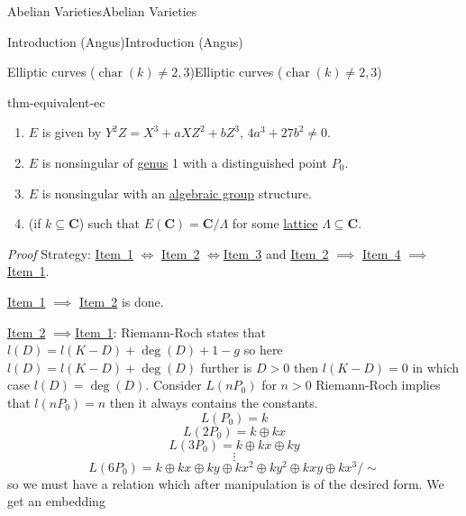 \documentclass[10pt,]{book}
\makeatletter
\renewcommand*{\proofname}{Proof}
\renewenvironment{proof}[1][\proofname]{\par
  \pushQED{\qed}%
  \normalfont \topsep6\p@\@plus6\p@\relax
  \trivlist
  \item\relax
    {\itshape
    #1\@addpunct{.}}\hspace\labelsep\ignorespaces
}{%
  \popQED\endtrivlist\@endpefalse
}
\numberwithin{equation}{section}
\newcommand{\CC}{\mathbf{C}}
\DeclareMathOperator{\characteristic}{char}
\newcommand{\gt}{>}
\makeatother
\begin{document}
\begin{chapterptx}{Abelian Varieties}{}{Abelian Varieties}{}{}
\begin{sectionptx}{Introduction (Angus)}{}{Introduction (Angus)}{}{}
\begin{subsectionptx}{Elliptic curves (\(\characteristic(k) \ne 2,3\))}{}{Elliptic curves (\(\characteristic(k) \ne 2,3\))}{}{}
\begin{theorem}{}{}{thm-equivalent-ec}
\begin{enumerate}
\item\hypertarget{item-cubic-eq}{}\(E\) is given by \(Y^2Z = X^3 + aXZ^2 + bZ^3\), \(4a^3 + 27b^2 \ne 0\).%
\item\hypertarget{item-nonsing-pt}{}\(E\) is nonsingular of \hyperref[def-class-set]{genus} 1 with a distinguished point \(P_0\).%
\item\hypertarget{item-nonsing-gp}{}\(E\) is nonsingular with an \hyperref[def-alg-gp]{algebraic group} structure.%
\item\hypertarget{item-cmplx}{}(if \(k \subseteq \CC\)) such that \(E(\CC) = \CC/\Lambda\) for some \hyperref[def-buntes-lattice]{lattice} \(\Lambda \subseteq \CC\).%
\end{enumerate}
%
\end{theorem}
\begin{proof}\hypertarget{proof-1}{}
\hypertarget{p-14}{}%
Strategy: \hyperlink{item-cubic-eq}{Item~1} \(\iff\) \hyperlink{item-nonsing-pt}{Item~2} \(\iff\)\hyperlink{item-nonsing-gp}{Item~3} and \hyperlink{item-nonsing-pt}{Item~2} \(\implies\) \hyperlink{item-cmplx}{Item~4} \(\implies\) \hyperlink{item-cubic-eq}{Item~1}.%
\par
\hypertarget{p-15}{}%
\hyperlink{item-cubic-eq}{Item~1} \(\implies\) \hyperlink{item-nonsing-pt}{Item~2} is done.%
\par
\hypertarget{p-16}{}%
\hyperlink{item-nonsing-pt}{Item~2} \(\implies\)\hyperlink{item-cubic-eq}{Item~1}: Riemann-Roch states that \(l(D) = l(K-D) +  \deg(D) + 1 -g \) so here \(l(D) = l(K-D) + \deg (D)\) further is \(D\gt 0\) then \(l(K-D) = 0\) in which case \(l(D) = \deg(D)\). Consider \(L(nP_0)\) for \(n \gt 0\) Riemann-Roch implies that \(l(nP_0) = n\) then it always contains the constants.%
\begin{equation*}
L(P_0) = k
\end{equation*}
%
\begin{equation*}
L(2P_0) = k \oplus kx
\end{equation*}
%
\begin{equation*}
L(3P_0) = k \oplus kx \oplus ky
\end{equation*}
%
\begin{equation*}
\vdots
\end{equation*}
%
\begin{equation*}
L(6P_0) = k \oplus kx \oplus ky \oplus k x^2 \oplus ky^2 \oplus kxy \oplus kx^3/\sim
\end{equation*}
so we must have a relation which after manipulation is of the desired form. We get an embedding%

\end{proof}
\end{subsectionptx}
\end{sectionptx}
\end{chapterptx}
\end{document}
